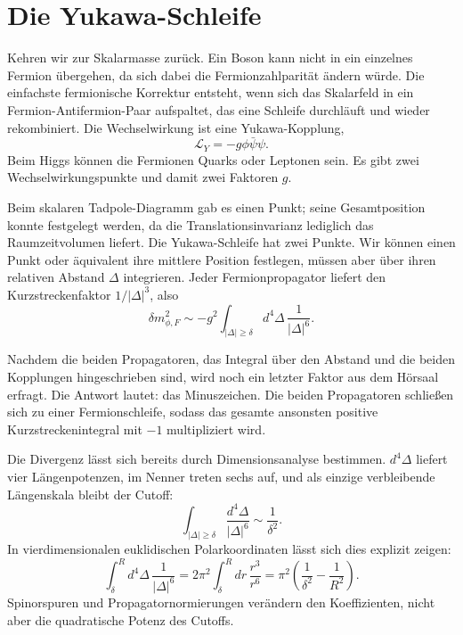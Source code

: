 \section{Die Yukawa-Schleife}

Kehren wir zur Skalarmasse zurück. Ein Boson kann nicht in ein einzelnes Fermion übergehen, da sich dabei die Fermionzahlparität ändern würde. Die einfachste fermionische Korrektur entsteht, wenn sich das Skalarfeld in ein Fermion-Antifermion-Paar aufspaltet, das eine Schleife durchläuft und wieder rekombiniert. Die Wechselwirkung ist eine Yukawa-Kopplung,
\begin{equation}
\mathcal L_Y=-g\phi\bar\psi\psi.
\end{equation}
Beim Higgs können die Fermionen Quarks oder Leptonen sein. Es gibt zwei Wechselwirkungspunkte und damit zwei Faktoren \(g\).

Beim skalaren Tadpole-Diagramm gab es einen Punkt; seine Gesamtposition konnte festgelegt werden, da die Translationsinvarianz lediglich das Raumzeitvolumen liefert. Die Yukawa-Schleife hat zwei Punkte. Wir können einen Punkt oder äquivalent ihre mittlere Position festlegen, müssen aber über ihren relativen Abstand \(\Delta\) integrieren. Jeder Fermionpropagator liefert den Kurzstreckenfaktor \(1/|\Delta|^3\), also
\begin{equation}
\delta m_{\phi,F}^2
\sim
-g^2\int_{|\Delta|\geq\delta}d^4\Delta\,
\frac{1}{|\Delta|^6}.
\end{equation}

Nachdem die beiden Propagatoren, das Integral über den Abstand und die beiden Kopplungen hingeschrieben sind, wird noch ein letzter Faktor aus dem Hörsaal erfragt. Die Antwort lautet: das Minuszeichen. Die beiden Propagatoren schließen sich zu einer Fermionschleife, sodass das gesamte ansonsten positive Kurzstreckenintegral mit \(-1\) multipliziert wird.

Die Divergenz lässt sich bereits durch Dimensionsanalyse bestimmen. \(d^4\Delta\) liefert vier Längenpotenzen, im Nenner treten sechs auf, und als einzige verbleibende Längenskala bleibt der Cutoff:
\begin{equation}
\int_{|\Delta|\geq\delta}
\frac{d^4\Delta}{|\Delta|^6}
\sim\frac{1}{\delta^2}.
\end{equation}
In vierdimensionalen euklidischen Polarkoordinaten lässt sich dies explizit zeigen:
\begin{equation}
\int_{\delta}^{R}d^4\Delta\,\frac{1}{|\Delta|^6}
=2\pi^2\int_{\delta}^{R}dr\,\frac{r^3}{r^6}
=\pi^2\left(\frac{1}{\delta^2}-\frac{1}{R^2}\right).
\end{equation}
Spinorspuren und Propagatornormierungen verändern den Koeffizienten, nicht aber die quadratische Potenz des Cutoffs.

